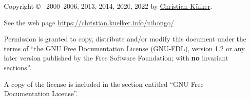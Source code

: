 \footnotesize

Copyright \copyright~ 2000–2006, 2013, 2014, 2020, 2022 by
\href{mailto:christian.kuelker@cipworx.org}{Christian K\"ulker}.

\medskip

See the web page
\href{https://christian.kuelker.info/nihongo/}{https://christian.kuelker.info/nihongo/}


Permission is granted to copy, distribute and/or modify this document under the
terms of “the GNU Free Documentation License (GNU-FDL), version 1.2 or any
later version published by the Free Software Foundation; with \textbf{no}
invariant sections”.

A copy of the license is included in the section entitled “GNU Free
Documentation License”.

\normalsize
